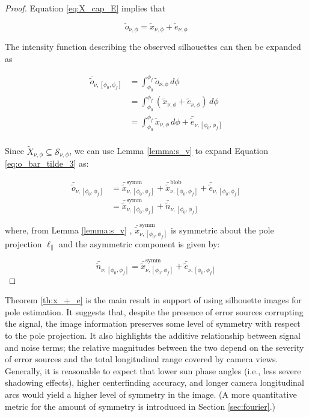 \begin{proof}
Equation \ref{eq:X_cap_E} implies that

    \begin{equation}
       \tilde{o}_{\nu,\phi} = \tilde{x}_{\nu,\phi} + \tilde{e}_{\nu,\phi}
    \end{equation}

The intensity function describing the observed silhouettes can then be expanded as

\begin{align}
    \bar{\tilde{o}}_{\nu,[\phi_0,\phi_f]} &= \int_{\phi_0}^{\phi_f} \tilde{o}_{\nu,\phi} \, d\phi \\
    &= \int_{\phi_0}^{\phi_f} \left( \tilde{x}_{\nu,\phi} + \tilde{e}_{\nu,\phi} \right) \, d\phi \\
    &= \int_{\phi_0}^{\phi_f} \tilde{x}_{\nu,\phi} \, d\phi + \bar{\tilde{e}}_{\nu,[\phi_0,\phi_f]} \label{eq:o_bar_tilde_3}\\
\end{align}

Since $\widetilde{X}_{\nu,\phi}\subseteq \mathcal{S}_{\nu,\phi}$, we can use Lemma \ref{lemma:s_v} to expand Equation \ref{eq:o_bar_tilde_3} as:

\begin{align}
    \bar{\tilde{o}}_{\nu,[\phi_0,\phi_f]} &= \bar{\tilde{x}}^{\mathrm{symm}}_{\nu,[\phi_0,\phi_f]} + \bar{\tilde{x}}^{\mathrm{blob}}_{\nu,[\phi_0,\phi_f]} + \bar{\tilde{e}}_{\nu,[\phi_0,\phi_f]} \\
    &= \bar{\tilde{x}}^{\mathrm{symm}}_{\nu,[\phi_0,\phi_f]} + \bar{\tilde{n}}_{\nu,[\phi_0,\phi_f]}
\end{align}


where, from Lemma \ref{lemma:s_v} , $\bar{\tilde{x}}^{\mathrm{symm}}_{\nu,[\phi_0,\phi_f]}$ is symmetric about the pole projection $\boldsymbol{\ell}_\parallel$ and the asymmetric component is given by:

\begin{equation}
    \bar{\tilde{n}}_{\nu,[\phi_0,\phi_f]}  = \bar{\tilde{x}}^{\mathrm{symm}}_{\nu,[\phi_0,\phi_f]} + \bar{\tilde{e}}_{\nu,[\phi_0,\phi_f]}
\end{equation}
\end{proof}

Theorem \ref{th:x_+_e} is the main result in support of using silhouette images for pole estimation. It suggests that, despite the presence of error sources corrupting the signal, the image information preserves some level of symmetry with respect to the pole projection. It also highlights the additive relationship between signal and noise terms; the relative magnitudes between the two depend on the severity of error sources and the total longitudinal range covered by camera views. Generally, it is reasonable to expect that lower sun phase angles (i.e., less severe shadowing effects), higher centerfinding accuracy, and longer camera longitudinal arcs would yield a higher level of symmetry in the image. (A more quantitative metric for the amount of symmetry is introduced in Section \ref{sec:fourier}.)

